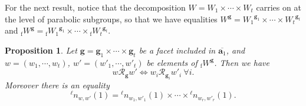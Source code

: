 \documentclass[11pt]{amsart}
\theoremstyle{plain}
\newtheorem{prop}[thm]{Proposition}
\theoremstyle{remark}
\numberwithin{equation}{section}
\begin{document}
	For the next result, notice that the decomposition $W= W_1\times\cdots \times W_t$ carries on at the level of parabolic subgroups, so that we have equalities ${W}^\mathbf{g}={W_1}^{\mathbf{g}_1}\times\cdots\times{W_t}^{\mathbf{g}_t}$ and ${_\mathrm{f}W}^\mathbf{g}={_\mathrm{f}W_1}^{\mathbf{g}_1}\times\cdots\times{_\mathrm{f}W_t}^{\mathbf{g}_t}$.
	\begin{prop}\label{reduction to irred}
		Let $\mathbf{g}=\mathbf{g}_1\times\cdots\times\mathbf{g}_t$ be a facet included in $\overline{\mathbf{a}_1}$, and $w=(w_1,\cdots,w_t)$, $w'=(w'_1,\cdots,w'_t)$ be elements of ${_\mathrm{f}}W^\mathbf{g}$. Then we have 
		\begin{equation}\label{351}
			w\mathscr{R}_\mathbf{g} w'\Longleftrightarrow w_i\mathscr{R}_{\mathbf{g}_i}w'_i~\forall i. 
		\end{equation}
		Moreover there is an equality
		\begin{equation}\label{352}
			{^\ell n}_{w,w'}(1)={^\ell n}_{w_1,w'_1}(1)\times\cdots\times {^\ell n}_{w_r,w'_r}(1).
		\end{equation}
	\end{prop}
\end{document}
